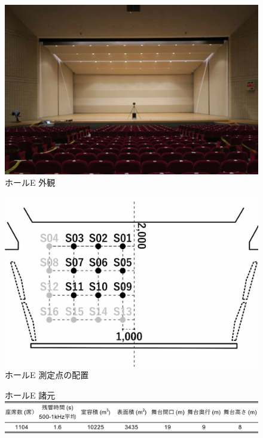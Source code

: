 \documentclass[11pt,a4j]{jreport}
\begin{document}
  \begin{figure}[H]
    \begin{minipage}{.5\linewidth} %
      \centering
      \includegraphics[width=.7\linewidth]{images/measuredHalls/resized/picture_e.jpg}
      \\ホールE 外観
    \end{minipage}%
    \begin{minipage}{.5\linewidth} %
      \centering
      \includegraphics[width=.7\linewidth]{images/measuredHalls/resized/flat_e.jpg}
      \\ホールE 測定点の配置
    \end{minipage}

    \begin{minipage}{1\linewidth}
      \centering
      ホールE 諸元\\
      \includegraphics[width=.8\linewidth]{images/measuredHalls/informationTable/e.pdf}
    \end{minipage}
  \end{figure}
\end{document}
